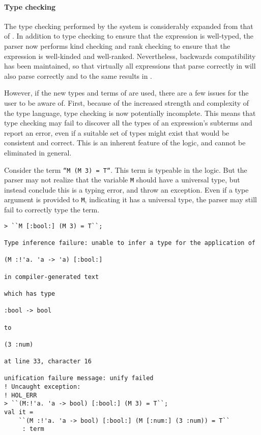 \paragraph{Type checking}

The type checking performed by the \HOLW{} system is considerably
expanded from that of \HOL.  In addition to type checking to ensure
that the expression is well-typed, the parser now performs kind checking
and rank checking to ensure that the expression is well-kinded and well-ranked.
Nevertheless, backwards compatibility has been maintained, so that 
virtually all expressions that parse correctly in \HOL{} will also
parse correctly and to the same results in \HOLW.

However, if the new types and terms of \HOLW{} are used, there are
a few issues for the user to be aware of.  First, because of the
increased strength and complexity of the type language, type checking
is now potentially incomplete.  This means that type checking may fail
to discover all the types of an expression's subterms and report an error,
even if a suitable set of types might exist that would be consistent and
correct.  This is an inherent feature of the logic, and cannot be eliminated
in general.

Consider the term \texttt{``M (M 3) = T``}. This term is typeable in the logic.
But
the parser may
not realize that the variable \texttt{M} should have a universal type,
but instead conclude this is a typing error, and throw an exception.
%
Even if a type argument is provided to \texttt{M}, indicating
it has a
universal type, the parser may still fail to correctly type the term.
%
%
%
%
%
%
%
%
%
%
%
%
%
\begin{session}
\begin{verbatim}
> ``M [:bool:] (M 3) = T``;

Type inference failure: unable to infer a type for the application of

(M :!'a. 'a -> 'a) [:bool:]

in compiler-generated text

which has type

:bool -> bool

to

(3 :num)

at line 33, character 16

unification failure message: unify failed
! Uncaught exception: 
! HOL_ERR
> ``(M:!'a. 'a -> bool) [:bool:] (M 3) = T``;
val it =
    ``(M :!'a. 'a -> bool) [:bool:] (M [:num:] (3 :num)) = T``
     : term
\end{verbatim}
\end{session}

